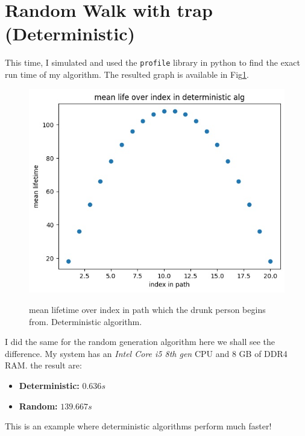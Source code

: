 \documentclass[12pt]{article}
\begin{document}
	\section{Random Walk with trap (Deterministic)}
	This time, I simulated and used the \texttt{profile} library in python to find the exact run time of my algorithm. The resulted graph is available in Fig\ref{fig:rw_trap_det}.
	\begin{figure}[h!]
		\centering
		\includegraphics[width=0.9\linewidth]{../p4/rw_trap.jpg}
		\label{fig:rw_trap_det}
		\caption{mean lifetime over index in path which the drunk person begins from.
			Deterministic algorithm.}
	\end{figure}
	
	I did the same for the random generation algorithm here we shall see the difference.
	My system has an \emph{Intel Core i5 8th gen} CPU and 8 GB of DDR4 RAM. the result are:\\
	\begin{itemize}
		\item \textbf{Deterministic:} $0.636 s$
		\item \textbf{Random:} $139.667 s$
	\end{itemize}
	This is an example where deterministic algorithms perform much faster!
\end{document}
